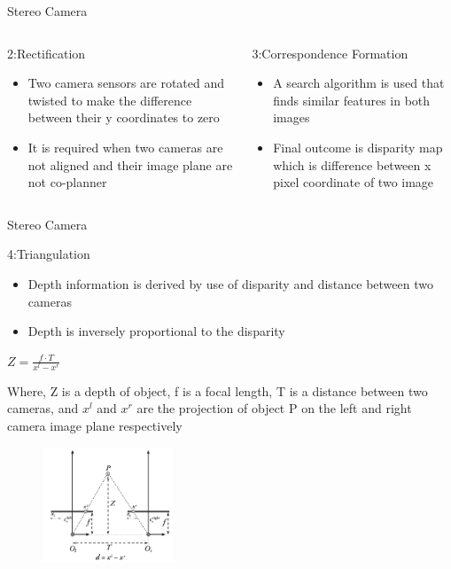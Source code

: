 \documentclass[10pt]{beamer}
\begin{document}
\begin{frame}{Stereo Camera}
\begin{columns}
   \begin{block}{2:Rectification}
       \begin{itemize}
           \item Two camera sensors are rotated and twisted to make the difference between their y coordinates to zero
           \item It is required when two cameras are not aligned and their image plane are not co-planner
       \end{itemize}
   \end{block}
   \begin{block}{3:Correspondence Formation}
       \begin{itemize}
           \item A search algorithm is used that finds similar features in both images
           \item Final outcome is disparity map which is difference between x pixel coordinate of two image
       \end{itemize}
   \end{block}
\end{columns}
\end{frame}

\begin{frame}{Stereo Camera}

    \begin{block}{4:Triangulation}
       \begin{itemize}
           \item Depth information is derived by use of disparity and distance between two cameras
           \item Depth is inversely proportional to the disparity
       \end{itemize}
    \centering
    $Z = \frac{f \cdot T}{x^l - x^r}$
       
    Where, Z is a depth of object, f is a focal length, T is a distance between two cameras, and $x^l$ and $x^r$ are the projection of object P on the left and right camera image plane respectively
       
    \begin{figure}
        \centering
        \includegraphics[width=0.35\textwidth]{Images/triangulate.png}
    \end{figure}
   \end{block}
\end{frame}
\end{document}
